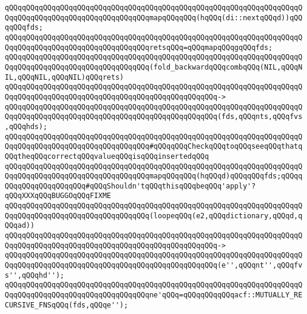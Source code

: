 \newline
\verb|qQQqqQQqqQQqqQQqqQQqqQQqqQQqqQQqqQQqqQQqqQQqqQQqqQQqqQQqqQQqqQQqqQQqqQQqqQQqqQQqqQQqqQQqqQQqqQQqqQQqqQQqmapqQQqqQQq(hqQQq(di::nextqQQqd))qQQqqQQqfds;|\newline
\newline
\verb|qQQqqQQqqQQqqQQqqQQqqQQqqQQqqQQqqQQqqQQqqQQqqQQqqQQqqQQqqQQqqQQqqQQqqQQqqQQqqQQqqQQqqQQqqQQqqQQqqQQqqQQqretsqQQq=qQQqmapqQQqgqQQqfds;|\newline
\newline
\verb|qQQqqQQqqQQqqQQqqQQqqQQqqQQqqQQqqQQqqQQqqQQqqQQqqQQqqQQqqQQqqQQqqQQqqQQqqQQqqQQqqQQqqQQqqQQqqQQqqQQqqQQq(fold_backwardqQQqcombqQQq(NIL,qQQqNIL,qQQqNIL,qQQqNIL)qQQqrets)|\newline
\verb|qQQqqQQqqQQqqQQqqQQqqQQqqQQqqQQqqQQqqQQqqQQqqQQqqQQqqQQqqQQqqQQqqQQqqQQqqQQqqQQqqQQqqQQqqQQqqQQqqQQqqQQqqQQqqQQqqQQqqQQq->|\newline
\verb|qQQqqQQqqQQqqQQqqQQqqQQqqQQqqQQqqQQqqQQqqQQqqQQqqQQqqQQqqQQqqQQqqQQqqQQqqQQqqQQqqQQqqQQqqQQqqQQqqQQqqQQqqQQqqQQqqQQqqQQq(fds,qQQqnts,qQQqfvs,qQQqhds);|\newline
\newline
\verb|qQQqqQQqqQQqqQQqqQQqqQQqqQQqqQQqqQQqqQQqqQQqqQQqqQQqqQQqqQQqqQQqqQQqqQQqqQQqqQQqqQQqqQQqqQQqqQQqqQQqqQQq#qQQqqQQqCheckqQQqtoqQQqseeqQQqthatqQQqtheqQQqcorrectqQQqvalueqQQqisqQQqinsertedqQQq|\newline
\newline
\verb|qQQqqQQqqQQqqQQqqQQqqQQqqQQqqQQqqQQqqQQqqQQqqQQqqQQqqQQqqQQqqQQqqQQqqQQqqQQqqQQqqQQqqQQqqQQqqQQqqQQqqQQqmapqQQqqQQq(hqQQqd)qQQqqQQqfds;qQQqqQQqqQQqqQQqqQQqqQQq#qQQqShouldn'tqQQqthisqQQqbeqQQq'apply'?qQQqXXXqQQqBUGGOqQQqFIXME|\newline
\newline
\verb|qQQqqQQqqQQqqQQqqQQqqQQqqQQqqQQqqQQqqQQqqQQqqQQqqQQqqQQqqQQqqQQqqQQqqQQqqQQqqQQqqQQqqQQqqQQqqQQqqQQqqQQq(loopeqQQq(e2,qQQqdictionary,qQQqd,qQQqad))|\newline
\verb|qQQqqQQqqQQqqQQqqQQqqQQqqQQqqQQqqQQqqQQqqQQqqQQqqQQqqQQqqQQqqQQqqQQqqQQqqQQqqQQqqQQqqQQqqQQqqQQqqQQqqQQqqQQqqQQqqQQqqQQq->|\newline
\verb|qQQqqQQqqQQqqQQqqQQqqQQqqQQqqQQqqQQqqQQqqQQqqQQqqQQqqQQqqQQqqQQqqQQqqQQqqQQqqQQqqQQqqQQqqQQqqQQqqQQqqQQqqQQqqQQqqQQqqQQq(e'',qQQqnt'',qQQqfvs'',qQQqhd'');|\newline
\newline
\verb|qQQqqQQqqQQqqQQqqQQqqQQqqQQqqQQqqQQqqQQqqQQqqQQqqQQqqQQqqQQqqQQqqQQqqQQqqQQqqQQqqQQqqQQqqQQqqQQqqQQqqQQqne'qQQq=qQQqqQQqqQQqacf::MUTUALLY_RECURSIVE_FNSqQQq(fds,qQQqe'');|\newline

